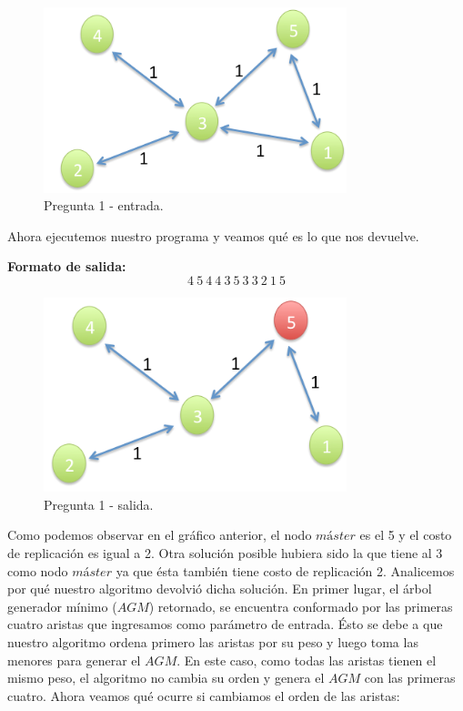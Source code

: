 \begin{figure}[H] %
\begin{center}
\includegraphics[width=250pt]{../imgs/pregAdicional01.jpg}
\caption{Pregunta 1 - entrada.}
\end{center}
\end{figure}
\newline
Ahora ejecutemos nuestro programa y veamos qué es lo que nos devuelve. \newline


\textbf{Formato de salida:}
$$4\ 5\ 4\ 4\ 3\ 5\ 3\ 3\ 2\ 1\ 5$$

\begin{figure}[H] %
\begin{center}
\includegraphics[width=250pt]{../imgs/pregAdicional02.jpg}
\caption{Pregunta 1 - salida.}
\end{center}
\end{figure}

\newline
Como podemos observar en el gráfico anterior, el nodo $máster$ es el 5 y el costo de replicación es igual a 2. Otra solución posible hubiera sido la que tiene al 3 como nodo $máster$ ya que ésta también tiene costo de replicación 2. \newline
\newline
Analicemos por qué nuestro algoritmo devolvió dicha solución. En primer lugar, el árbol generador mínimo ($AGM$) retornado, se encuentra conformado por las primeras cuatro aristas que ingresamos como parámetro de entrada. Ésto se debe a que nuestro algoritmo ordena primero las aristas por su peso y luego toma las menores para generar el $AGM$. En este caso, como todas las aristas tienen el mismo peso, el algoritmo no cambia su orden y genera el $AGM$ con las primeras cuatro. \newline
\newline
Ahora veamos qué ocurre si cambiamos el orden de las aristas:

